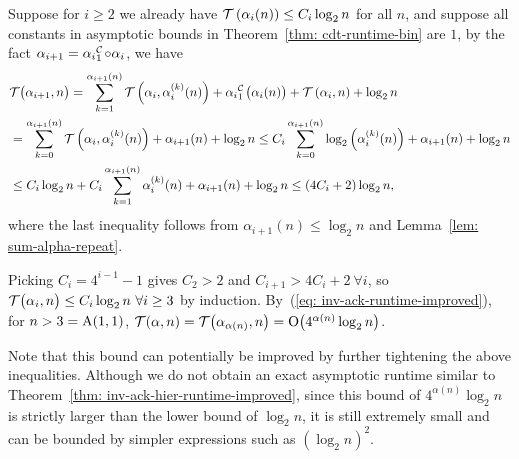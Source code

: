Suppose for $i\ge 2$ we already have $\mathcal{T}\left(\alpha_i(n)\right) \le C_i\log_2n$ for all $n$, and suppose all constants in asymptotic bounds in Theorem~\ref{thm: cdt-runtime-bin} are $1$, by the fact $\alpha_{i+1} = \cdt{\alpha_i}{1} \circ \alpha_i$, we have
\begin{equation*}
\begin{aligned}
& \runtime\big(\alpha_{i+1}, n\big) =
\sum_{k=1}^{\alpha_{i+1}(n)} \runtime\left(\alpha_i, \alpha_i^{(k)}(n)\right)
+ \cdt{\alpha_i}{1}\big(\alpha_i(n)\big) + \runtime\left(\alpha_i, n\right) + \log_2 n
\\
& = \sum_{k=0}^{\alpha_{i+1}(n)} \runtime\left(\alpha_i, \alpha_i^{(k)}(n)\right) + \alpha_{i+1}(n) + \log_2 n \le C_i\sum_{k=0}^{\alpha_{i+1}(n)}\log_2 \left(\alpha_i^{(k)}(n)\right) + \alpha_{i+1}(n) + \log_2 n\\
 & \le C_i\log_2n + C_i\sum_{k=1}^{\alpha_{i+1}(n)}\alpha_i^{(k)}(n) + \alpha_{i+1}(n)
 + \log_2 n \le (4C_i+2)\log_2n,
\end{aligned}
\end{equation*}
where the last inequality follows from $\alpha_{i+1}(n)\le \log_2n$ and Lemma~\ref{lem: sum-alpha-repeat}.

Picking $C_i = 4^{i-1} - 1$ gives $C_2 > 2$ and $C_{i+1} > 4C_i + 2 \ \forall i$, so $\mathcal{T}\big(\alpha_i, n\big) \le C_i\log_2n \ \forall i\ge 3$ by induction. 
By~(\ref{eq: inv-ack-runtime-improved}), for $n > 3 = \text{A}(1, 1)$, $\mathcal{T}(\alpha, n) = \mathcal{T}\big(\alpha_{\alpha(n)}, n\big) = \text{O}\big(4^{\alpha(n)}\log_2n\big)$. 

Note that this bound can potentially be improved by further tightening the above inequalities. Although we do not obtain an exact asymptotic runtime similar 
to Theorem~\ref{thm: inv-ack-hier-runtime-improved}, since this bound of $4^{\alpha(n)}\log_2n$ is strictly larger than the lower bound of $\log_2n$, it is still extremely small and can be bounded by simpler expressions such as $(\log_2n)^2$.
